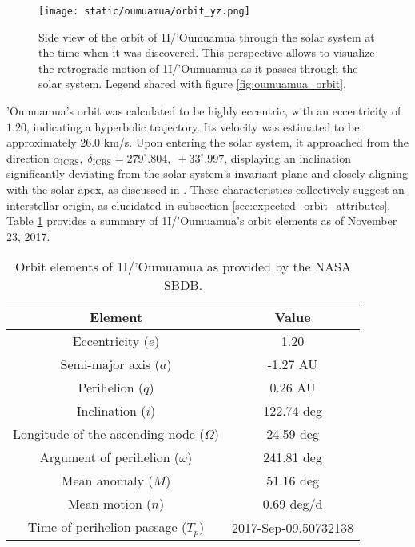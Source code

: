 \begin{figure}[H]
  \centering
  \texttt{[image: static/oumuamua/orbit\_yz.png]}
  \caption[Side view of the orbit of 1I/'Oumuamua through the solar system]
  {
    Side view of the orbit of 1I/'Oumuamua through the solar system at the time when it was
    discovered. This perspective allows to visualize the retrograde motion of
    1I/'Oumuamua as it passes through the solar system. Legend shared with
        figure \ref{fig:oumuamua_orbit}.
  }
  \label{fig:oumuamua_orbit_yz}
\end{figure}

'Oumuamua's orbit was calculated to be highly eccentric, with an eccentricity of
$1.20$, indicating a hyperbolic trajectory. Its velocity was estimated to be
approximately $26.0$ km/s. Upon entering the solar system, it approached from
the direction $\alpha_{\text{ICRS}},\; \delta_{\text{ICRS}} = 279^\circ.804,\;
  +33^\circ.997$, displaying an inclination significantly deviating from the solar
system's invariant plane and closely aligning with the solar apex, as discussed
in \cite{mamajek2017}. These characteristics collectively suggest an
interstellar origin, as elucidated in subsection
\ref{sec:expected_orbit_attributes}. Table \ref{tab:oumuamua_elements} provides
a summary of 1I/'Oumuamua's orbit elements as of November 23, 2017.

\begin{table}[H]
  \centering
  \begin{tabular}{|c|c|}
    \hline
    Element                                    & Value                \\
    \hline
    Eccentricity ($e$)                         & 1.20                 \\
    Semi-major axis ($a$)                      & -1.27 AU             \\
    Perihelion ($q$)                           & 0.26 AU              \\
    Inclination ($i$)                          & 122.74 deg           \\
    Longitude of the ascending node ($\Omega$) & 24.59 deg            \\
    Argument of perihelion ($\omega$)          & 241.81 deg           \\
    Mean anomaly ($M$)                         & 51.16 deg            \\
    Mean motion ($n$)                          & 0.69 deg/d           \\
    Time of perihelion passage ($T_p$)         & 2017-Sep-09.50732138 \\
    \hline
  \end{tabular}
  \caption{Orbit elements of 1I/'Oumuamua as provided by the NASA SBDB.}
  \label{tab:oumuamua_elements}
\end{table}

